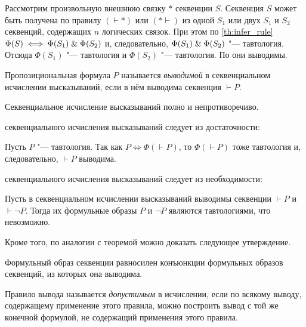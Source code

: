 \begin{iproof}
\begin{itemize}
				Рассмотрим произвольную внешнюю связку $ * $ секвенции $ S $.
				Секвенция $ S $ может быть получена по правилу $ (\vdash *) $ или $ (* \vdash) $ из одной $ S_1 $ или двух $ S_1 $ и $ S_2 $ секвенций, содержащих $ n $ логических связок.
				При этом по \autoref{th:infer_rule} $ \Phi(S) \iff \Phi(S_1) \mathrel\& \Phi(S_2) $ и, следовательно, $ \Phi(S_1) \mathrel\& \Phi(S_2) $ "--- тавтология.
				Отсюда $ \Phi(S_1) $ "--- тавтология и $ \Phi(S_2) $ "--- тавтология.
				По  они выводимы.
		\end{itemize}
\end{iproof}

\begin{definition}
	Пропозициональная формула $ P $ называется \emph{выводимой} в секвенциальном исчислении высказываний, если в нём выводима секвенция $ \vdash P $.
\end{definition}

\begin{implication}
	Секвенциальное исчисление высказываний полно и непротиворечиво.
\end{implication}

\begin{iproof}
	\item {} секвенциального исчисления высказываний следует из достаточности:

		Пусть $ P $ "--- тавтология. Так как $ P \iff \Phi(\vdash P) $, то $ \Phi(\vdash P) $ тоже тавтология и, следовательно, $ \vdash P $ выводима.

	\item {} секвенциального исчисления высказываний следует из необходимости:

		Пусть в секвенциальном исчислении высказываний выводимы секвенции $ \vdash P $ и $ \vdash \neg P $.
		Тогда их формульные образы $ P $ и $ \neg P $ являются тавтологиями, что невозможно.
\end{iproof}

Кроме того, по аналогии с теоремой можно доказать следующее утверждение.

\begin{statement}
	Формульный образ секвенции равносилен конъюнкции формульных образов секвенций, из которых она выводима.
\end{statement}

\begin{definition}
	Правило вывода называется \emph{допустимым} в исчислении, если по всякому выводу, содержащему применение этого правила, можно построить вывод с той же конечной формулой, не содержащий применения этого правила.
\end{definition}

